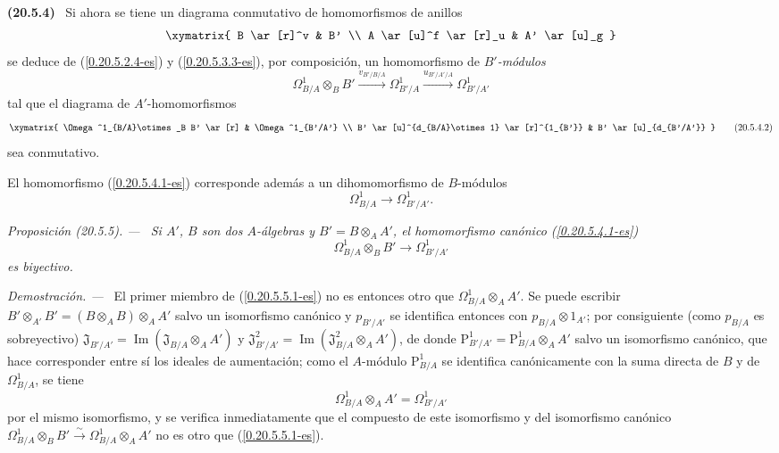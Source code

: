 \documentclass[10pt,oneside]{book}
\makeatletter
\newcommand{\sref}[1]{\textup{(\ref{#1})}}
\newcommand{\setmanualcurrentlabel}[1]{\def\@currentlabel{#1}}
\newcommand{\oldpage}[2][]{%
  \setcounter{footnote}{0}%
  \marginpar{\scriptsize\textbf{#1}~|~#2}\ignorespaces}
\newenvironment{env}[1][]{\setmanualcurrentlabel{#1}\par\medskip\noindent\textbf{(#1)}\ }{\par}
\newenvironment{proposition}[1][]{%
  \setmanualcurrentlabel{#1}\par\medskip\noindent\itshape Proposición (#1). ---\ }{\par}
\newenvironment{proof}{%
  \par\medskip\noindent\textit{Demostración. ---\ }}{\par}
\makeatother
\begin{document}
\begin{env}[20.5.4]
\label{0.20.5.4-es}
Si ahora se tiene un diagrama conmutativo de homomorfismos de anillos
\[
\xymatrix{
  B \ar[r]^v & B' \\
  A \ar[u]^f \ar[r]_u & A' \ar[u]_g
}
\]
se deduce de \sref{0.20.5.2.4-es} y \sref{0.20.5.3.3-es}, por composición,
un homomorfismo de \emph{$B'$-módulos}
\begin{equation}
\tag{20.5.4.1}
\label{0.20.5.4.1-es}
  \Omega^1_{B/A}\otimes_B B'
  \xrightarrow{v_{B'/B/A}}\Omega^1_{B'/A}
  \xrightarrow{u_{B'/A'/A}}\Omega^1_{B'/A'}
\end{equation}
tal que el diagrama de $A'$-homomorfismos
\[
\xymatrix{
  \Omega^1_{B/A}\otimes_B B' \ar[r] & \Omega^1_{B'/A'} \\
  B' \ar[u]^{d_{B/A}\otimes1} \ar[r]^{1_{B'}} &
  B' \ar[u]_{d_{B'/A'}}
}
\tag{20.5.4.2}
\label{0.20.5.4.2-es}
\]
sea conmutativo.

El homomorfismo \sref{0.20.5.4.1-es} corresponde además a un
dihomomorfismo de $B$-módulos
\begin{equation}
\tag{20.5.4.3}
\label{0.20.5.4.3-es}
  \Omega^1_{B/A}\to\Omega^1_{B'/A'}.
\end{equation}
\end{env}

\begin{proposition}[20.5.5]
\label{0.20.5.5-es}
Si $A'$, $B$ son dos $A$-álgebras y $B'=B\otimes_A A'$,
el homomorfismo canónico \textup{\sref{0.20.5.4.1-es}}
\begin{equation}
\tag{20.5.5.1}
\label{0.20.5.5.1-es}
  \Omega^1_{B/A}\otimes_B B'\to\Omega^1_{B'/A'}
\end{equation}
es biyectivo.
\end{proposition}

\begin{proof}
\oldpage[0\textsubscript{IV-1}]{131}
El primer miembro de \sref{0.20.5.5.1-es} no es entonces otro que
$\Omega^1_{B/A}\otimes_A A'$. Se puede escribir
$B'\otimes_{A'}B'=(B\otimes_A B)\otimes_A A'$ salvo un isomorfismo canónico
y $p_{B'/A'}$ se identifica entonces con
$p_{B/A}\otimes1_{A'}$; por consiguiente (como $p_{B/A}$ es sobreyectivo)
$\mathfrak{J}_{B'/A'}=\operatorname{Im}(\mathfrak{J}_{B/A}\otimes_A A')$
y
$\mathfrak{J}^2_{B'/A'}
=\operatorname{Im}(\mathfrak{J}^2_{B/A}\otimes_A A')$, de donde
$\mathrm{P}^1_{B'/A'}=\mathrm{P}^1_{B/A}\otimes_A A'$ salvo un isomorfismo
canónico, que hace corresponder entre sí los ideales de aumentación;
como el $A$-módulo $\mathrm{P}^1_{B/A}$ se identifica canónicamente con la
suma directa de $B$ y de $\Omega^1_{B/A}$, se tiene
\begin{equation}
\tag{20.5.5.2}
\label{0.20.5.5.2-es}
  \Omega^1_{B/A}\otimes_A A'=\Omega^1_{B'/A'}
\end{equation}
por el mismo isomorfismo, y se verifica inmediatamente que el compuesto de este
isomorfismo y del isomorfismo canónico
$\Omega^1_{B/A}\otimes_B B'\xrightarrow{\sim}
\Omega^1_{B/A}\otimes_A A'$ no es otro que \sref{0.20.5.5.1-es}.
\end{proof}
\end{document}
